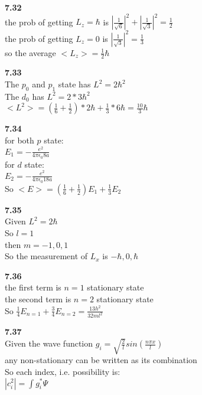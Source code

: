 \documentclass{article}
\begin{document}
\textbf{7.32}\\
the prob of getting $L_z = \hbar$ is $|\frac{1}{\sqrt{6}}|^2+|\frac{1}{\sqrt{3}}|^2 = \frac{1}{2}$\\
the prob of getting $L_z = 0$ is $|\frac{1}{\sqrt{3}}|^2 = \frac{1}{3}$\\
so the average $<L_z> = \frac{1}{2}\hbar$\\
\newline

\textbf{7.33}\\
The $p_0$ and $p_1$ state has $L^2 = 2\hbar^2$\\
The $d_0$ has $L^2 = 2*3\hbar^2$\\
$<L^2> = (\frac{1}{6}+\frac{1}{2})*2\hbar+\frac{1}{3}*6\hbar = \frac{10}{3}\hbar$\\
\newline

\textbf{7.34}\\
for both $p$ state:\\
$E_1 = -\frac{e^2}{4\pi \epsilon_0 8a}$\\
for $d$ state:\\
$E_2 = -\frac{e^2}{4\pi \epsilon_0 18a}$\\
So $<E> = (\frac{1}{6}+\frac{1}{2})E_1 + \frac{1}{3}E_2$\\
\newline

\textbf{7.35}\\
Given $L^2 = 2\hbar$\\
So $l= 1$\\
then $m = -1, 0, 1$\\
So the measurement of $L_x$ is $-\hbar, 0, \hbar$\\
\newline

\textbf{7.36}\\
the first term is $n = 1$ stationary state\\
the second term is $n = 2$ stationary state\\
So $\frac{1}{4}E_{n = 1} + \frac{3}{4}E_{n = 2} = \frac{13h^2}{32ml^2}$\\
\newline

\textbf{7.37}\\
Given the wave function $g_i = \sqrt{\frac{2}{l}}sin(\frac{n\pi x}{l})$\\
any non-stationary can be written as its combination\\
So each index, i.e. possibility is: \\
$|c_i^2| = \int g_i^*\Psi$\\
\newline
\end{document}
